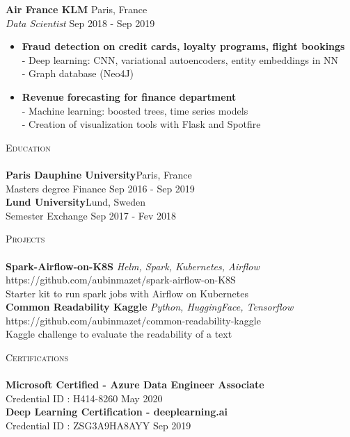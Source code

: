 \documentclass[a4paper]{article}
\newcommand{\lineunder} {
    \vspace*{-8pt} \\
    \hspace*{-18pt} \hrulefill \\
}
\newcommand{\header} [1] {
    {\hspace*{-18pt}\vspace*{6pt} \textsc{#1}}
    \vspace*{-6pt} \lineunder
}
\begin{document}
\textbf{Air France KLM} \hfill Paris, France\\
\textit{Data Scientist} \hfill Sep 2018 - Sep 2019\\
\begin{itemize} \itemsep 1pt

    \item {\bf Fraud detection on credit cards, loyalty programs, flight bookings}\\
    - Deep learning: CNN, variational autoencoders, entity embeddings in NN\\
    - Graph database (Neo4J)\\

    \item {\bf Revenue forecasting for finance department}\\
    - Machine learning: boosted trees, time series models \\
    - Creation of visualization tools with Flask and Spotfire \\
\end{itemize}


\header{Education}
\textbf{Paris Dauphine University}\hfill Paris, France\\
Master\textquotesingle{}s degree Finance \hfill Sep 2016 - Sep 2019\\
\textbf{Lund University}\hfill Lund, Sweden\\
Semester Exchange \hfill Sep 2017 - Fev 2018\\
\vspace{2mm}


\header{Projects}
{\textbf{Spark-Airflow-on-K8S}} {\sl Helm, Spark, Kubernetes, Airflow} \hfill https://github.com/aubinmazet/spark-airflow-on-K8S\\
Starter kit to run spark jobs with Airflow on Kubernetes\\
\vspace*{2mm}
{\textbf{Common Readability Kaggle}} {\sl Python, HuggingFace, Tensorflow} \hfill https://github.com/aubinmazet/common-readability-kaggle\\
Kaggle challenge to evaluate the readability of a text\\
\vspace*{2mm}

\header{Certifications}
\textbf{Microsoft Certified - Azure Data Engineer Associate}\\
Credential ID : H414-8260
\hfill May 2020\\
\textbf{Deep Learning Certification - deeplearning.ai}\\
Credential ID : ZSG3A9HA8AYY
\hfill Sep 2019\\
\vspace*{2mm}

\ 
\end{document}

